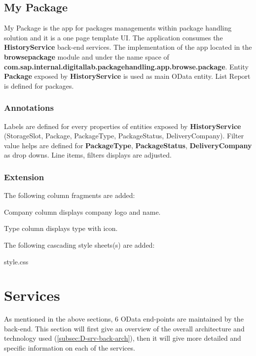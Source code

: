 \subsection{My Package}

My Package is the app for packages managements within package handling solution and it is a one page template UI.
The application consumes the \textbf{HistoryService} back-end services.
The implementation of the app
located in the \textbf{browsepackage} module and under the name space of
\textbf{com.sap.internal.digitallab.packagehandling.app.browse.package}.
Entity \textbf{Package} exposed by  \textbf{HistoryService} is used as main OData entity.
List Report is defined for packages.

\subsubsection{Annotations}
Labels are defined for every properties of entities exposed by \textbf{HistoryService} (StorageSlot, Package, PackageType, PackageStatus, DeliveryCompany). 
Filter value helps are defined for \textbf{PackageType}, \textbf{PackageStatus}, \textbf{DeliveryCompany} as drop downs.
Line items, filters displays are adjusted.

\subsubsection{Extension}

\bigskip
The following column fragments are added:
\begin{compactenum}
    \item Company column displays company logo and name.
    \item Type column displays type with icon.
\end{compactenum}

\bigskip
The following cascading style sheets(s) are added:
\begin{compactenum}
    \item style.css
\end{compactenum}


\section{Services}
\label{sec:D-srv}

As mentioned in the above sections, 6 OData end-points are maintained by the back-end. This section will first give an overview of the overall architecture and technology used (\autoref{subsec:D-srv-back-arch}), then it will give more detailed and specific information on each of the services.

